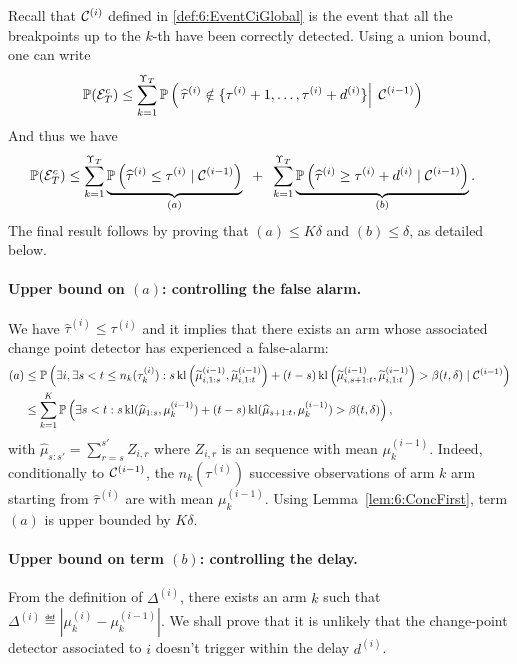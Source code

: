 Recall that $\mathcal{C}^{(i)}$ defined in \eqref{def:6:EventCiGlobal} is the event that all the breakpoints up to the $k$-th have been correctly detected.
Using a union bound, one can write
%
\begin{align*}
    \mathbb{P}(\mathcal{E}_T^c) & \leq \sum\limits_{k=1}^{\Upsilon_T}
    \mathbb{P}\left(\left. \widehat{\tau}^{(i)} \notin \{ \tau^{(i)}+1, \dots, \tau^{(i)} + d^{(i)} \} \right|\; \mathcal{C}^{(i-1)}\right)
\end{align*}
And thus we have
\begin{align*}
    \mathbb{P}(\mathcal{E}_T^c) & \leq \sum\limits_{k=1}^{\Upsilon_T} \underbrace{\mathbb{P}\left(\widehat{\tau}^{(i)} \leq \tau^{(i)} \;|\; \mathcal{C}^{(i-1)}\right)}_{(a)} \;\; + \;\; \sum\limits_{k=1}^{\Upsilon_T} \underbrace{\mathbb{P}\left(\widehat{\tau}^{(i)} \geq \tau^{(i)} + d^{(i)} \;|\; \mathcal{C}^{(i-1)}\right)}_{(b)}.
\end{align*}
%
The final result follows by proving that $(a) \leq K \delta$ and $(b)\leq \delta$, as detailed below.


\paragraph{Upper bound on $(a)$: controlling the false alarm.}
%
We have $\widehat{\tau}^{(i)} \leq \tau^{(i)}$ and it implies that there exists an arm whose associated change point detector has experienced a false-alarm:
%
\begin{align*}
    (a) & \leq \mathbb{P}\left(\exists i, \exists s < t \leq n_k(\tau_k^{(i)}) : s \, \mathrm{kl}\left(\widetilde{\mu}_{i,1:s}^{(i-1)},\widetilde{\mu}_{i,1:t}^{(i-1)}\right) + (t - s) \, \mathrm{kl}\left(\widetilde{\mu}_{i,s+1:t}^{(i-1)},\widetilde{\mu}_{i,1:t}^{(i-1)}\right) > \beta(t, \delta) \;|\; \mathcal{C}^{(i-1)}\right) \\
    & \leq \sum_{k=1}^K\mathbb{P}\left(\exists s < t : s \, \mathrm{kl}(\widehat{\mu}_{1:s},\mu_k^{(i-1)}) + (t - s) \, \mathrm{kl}(\widehat{\mu}_{s+1:t}, \mu_k^{(i-1)}) > \beta(t, \delta)\right),
\end{align*}
with $\widehat{\mu}_{s:s'} = \sum_{r=s}^{s'} Z_{i,r}$ where $Z_{i,r}$ is an \iid{} sequence with mean $\mu_k^{(i-1)}$.
Indeed, conditionally to $\mathcal{C}^{(i-1)}$, the $n_k(\tau^{(i)})$ successive observations of arm $k$ arm starting from $\widehat{\tau}^{(i)}$ are \iid{} with mean $\mu_k^{(i-1)}$.
Using Lemma~\ref{lem:6:ConcFirst}, term $(a)$ is upper bounded by $K\delta$.


\paragraph{Upper bound on term $(b)$: controlling the delay.}
\label{par:6:controllingDelayInOneProof}
%
From the definition of $\Delta^{(i)}$, there exists an arm $k$ such that $\Delta^{(i)} \eqdef |\mu_k^{(i)} - \mu_k^{(i-1)}|$. We shall prove that it is unlikely that the change-point detector associated to $i$ doesn't trigger within the delay $d^{(i)}$.

